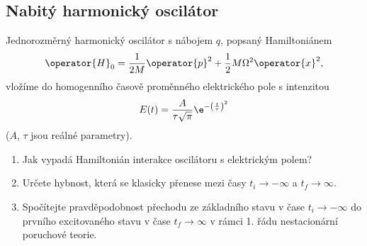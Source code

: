 \subsection{Nabitý harmonický oscilátor}
Jednorozměrný harmonický oscilátor s nábojem $q$, popsaný Hamiltoniánem 
\begin{equation}
    \operator{H}_{0}=\frac{1}{2M}\operator{p}^{2}+\frac{1}{2}M\Omega^{2}\operator{x}^{2},
\end{equation}
vložíme do homogenního časově proměnného elektrického pole s intenzitou
\begin{equation}
    E(t)=\frac{A}{\tau\sqrt{\pi}}\e^{-\left(\frac{t}{\tau}\right)^{2}}
\end{equation}
($A$, $\tau$ jsou reálné parametry).
    
\begin{enumerate}
\item
    Jak vypadá Hamiltonián interakce oscilátoru s elektrickým polem?

\item
    Určete hybnost, která se klasicky přenese mezi časy $t_{i}\rightarrow-\infty$ a $t_{f}\rightarrow\infty$.
    
\item
    Spočítejte pravděpodobnost přechodu ze základního stavu v čase $t_{i}\rightarrow-\infty$ do prvního excitovaného stavu v čase $t_{f}\rightarrow\infty$ v rámci 1. řádu nestacionární poruchové teorie.		
\end{enumerate}
	
